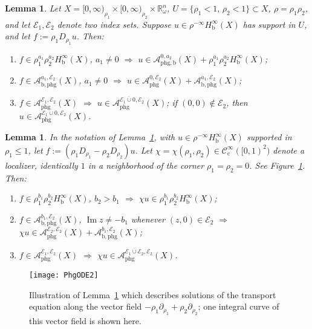 \documentclass[reqno,11pt,letterpaper]{amsart}
\numberwithin{equation}{section}
\numberwithin{figure}{section}
\newtheorem{lemma}[thm]{Lemma}
\theoremstyle{definition}
\theoremstyle{remark}
\newcommand{\mc}{\mathcal}
\newcommand{\cA}{\mc A}
\newcommand{\cC}{\mc C}
\newcommand{\cE}{\mc E}
\newcommand{\R}{\mathbb{R}}
\renewcommand{\Im}{\operatorname{Im}}
\newcommand{\extcup}{\operatorname{\ol\cup}}
\newcommand{\ol}{\overline}
\newcommand{\pa}{\partial}
\newcommand{\bop}{{\mathrm{b}}}
\newcommand{\cp}{{\mathrm{c}}}
\newcommand{\CIc}{\cC^\infty_\cp}
\newcommand{\Hb}{H_{\bop}}
\newcommand{\phg}{{\mathrm{phg}}}
\newcommand{\usref}[1]{{\upshape\ref{#1}}}
\begin{document}
\begin{lemma}
\label{LemmaPhgODE}
  Let $X=[0,\infty)_{\rho_1}\times[0,\infty)_{\rho_2}\times\R^n_\omega$, $U=\{\rho_1<1,\,\rho_2<1\}\subset X$, $\rho=\rho_1\rho_2$, and let $\cE_1,\cE_2$ denote two index sets. Suppose $u\in\rho^{-\infty}\Hb^\infty(X)$ has support in $U$, and let $f:=\rho_1 D_{\rho_1}u$. Then:
  \begin{enumerate}
  \item\label{ItPhgODEbb} $f\in\rho_1^{a_1}\rho_2^{a_2}\Hb^\infty(X)$, $a_1\neq 0$ $\Rightarrow$ $u\in\cA_{\phg,\bop}^{0,a_2}(X)+\rho_1^{a_1}\rho_2^{a_2}\Hb^\infty(X)$;
  \item\label{ItPhgODEbp} $f\in\cA_{\bop,\phg}^{a_1,\cE_2}(X)$, $a_1\neq 0$ $\Rightarrow$ $u\in\cA_\phg^{0,\cE_2}(X)+\cA_{\bop,\phg}^{a_1,\cE_2}(X)$;
  \item\label{ItPhgODEpp} $f\in\cA_\phg^{\cE_1,\cE_2}(X)$ $\Rightarrow$ $u\in\cA_\phg^{\cE_1\extcup 0,\cE_2}(X)$; if $(0,0)\notin\cE_2$, then $u\in\cA_\phg^{\cE_1\cup 0,\cE_2}(X)$.
  \end{enumerate}
\end{lemma}

\begin{lemma}
\label{LemmaPhgODE2}
  In the notation of Lemma~\usref{LemmaPhgODE}, with $u\in\rho^{-\infty}\Hb^\infty(X)$ supported in $\rho_1\leq 1$, let $f:=(\rho_1 D_{\rho_1}-\rho_2 D_{\rho_2})u$. Let $\chi=\chi(\rho_1,\rho_2)\in\CIc([0,1)^2)$ denote a localizer, identically $1$ in a neighborhood of the corner $\rho_1=\rho_2=0$. See Figure~\usref{FigPhgODE2}. Then:
  \begin{enumerate}
  \item\label{ItPhgODE2bb} $f\in\rho_1^{b_1}\rho_2^{b_2}\Hb^\infty(X)$, $b_2>b_1$ $\Rightarrow$ $\chi u\in\rho_1^{b_1}\rho_2^{b_2}\Hb^\infty(X)$;
  \item\label{ItPhgODE2bp} $f\in\cA_{\bop,\phg}^{b_1,\cE_2}(X)$, $\Im z\neq-b_1$ whenever $(z,0)\in\cE_2$ $\Rightarrow$ $\chi u\in\cA_\phg^{\cE_2,\cE_2}(X)+\cA_{\bop,\phg}^{b_1,\cE_2}(X)$;
  \item\label{ItPhgODE2pp} $f\in\cA_\phg^{\cE_1,\cE_2}(X)$ $\Rightarrow$ $\chi u\in\cA_\phg^{\cE_1\extcup\cE_2,\cE_2}(X)$.
  \end{enumerate}
\end{lemma}

\begin{figure}[!ht]
\texttt{[image: PhgODE2]}
\caption{Illustration of Lemma~\ref{LemmaPhgODE2} which describes solutions of the transport equation along the vector field $-\rho_1\pa_{\rho_1}+\rho_2\pa_{\rho_2}$; one integral curve of this vector field is shown here.}
\label{FigPhgODE2}
\end{figure}
\end{document}
